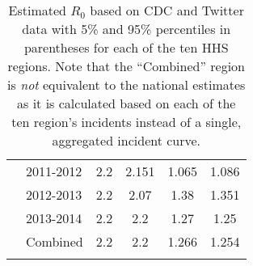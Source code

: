 \begin{longtable}{|c|l|c|c|c|c|}
 {\multirow{4}{*}{ Combined }} & 2011-2012 & 2.2  &  2.151 &   1.065  &   1.086  \\ \cline{2-6}
  &  2012-2013 & 2.2  &  2.07 &   1.38  &   1.351  \\ \cline{2-6}
  &  2013-2014 & 2.2  &  2.2 &   1.27  &   1.25  \\ \cline{2-6}
  &  Combined & 2.2  &  2.2 &   1.266  &   1.254  \\ \cline{1-6}
\caption[Estimated R0 based on CDC and Twitter data with 5\% and 95\% percentiles in parentheses for each of the ten HHS regions]{Estimated \(R_0\) based on CDC and Twitter data with 5\% and 95\% percentiles in parentheses for each of the ten HHS regions. Note that the ``Combined'' region is \emph{not} equivalent to the national estimates as it is calculated based on each of the ten region's incidents instead of a single, aggregated incident curve.}
\label{tab:hhsr0}
\end{longtable}
